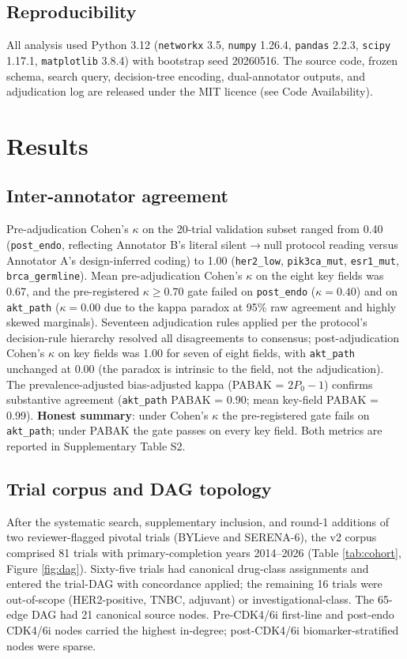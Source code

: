 \documentclass[11pt,a4paper]{article}
\begin{document}
\subsection{Reproducibility}
All analysis used Python 3.12 (\texttt{networkx} 3.5, \texttt{numpy} 1.26.4, \texttt{pandas} 2.2.3, \texttt{scipy} 1.17.1, \texttt{matplotlib} 3.8.4) with bootstrap seed 20260516. The source code, frozen schema, search query, decision-tree encoding, dual-annotator outputs, and adjudication log are released under the MIT licence (see Code Availability).

\section{Results}\label{sec:results}

\subsection{Inter-annotator agreement}
Pre-adjudication Cohen's $\kappa$ on the 20-trial validation subset ranged from 0.40 (\texttt{post\_endo}, reflecting Annotator B's literal silent$\to$null protocol reading versus Annotator A's design-inferred coding) to 1.00 (\texttt{her2\_low}, \texttt{pik3ca\_mut}, \texttt{esr1\_mut}, \texttt{brca\_germline}). Mean pre-adjudication Cohen's $\kappa$ on the eight key fields was 0.67, and the pre-registered $\kappa \ge 0.70$ gate failed on \texttt{post\_endo} ($\kappa = 0.40$) and on \texttt{akt\_path} ($\kappa = 0.00$ due to the kappa paradox at 95\% raw agreement and highly skewed marginals). Seventeen adjudication rules applied per the protocol's decision-rule hierarchy resolved all disagreements to consensus; post-adjudication Cohen's $\kappa$ on key fields was 1.00 for seven of eight fields, with \texttt{akt\_path} unchanged at 0.00 (the paradox is intrinsic to the field, not the adjudication). The prevalence-adjusted bias-adjusted kappa (PABAK = $2P_0 - 1$) confirms substantive agreement (\texttt{akt\_path} PABAK = 0.90; mean key-field PABAK = 0.99). \textbf{Honest summary}: under Cohen's $\kappa$ the pre-registered gate fails on \texttt{akt\_path}; under PABAK the gate passes on every key field. Both metrics are reported in Supplementary Table S2.

\subsection{Trial corpus and DAG topology}
After the systematic search, supplementary inclusion, and round-1 additions of two reviewer-flagged pivotal trials (BYLieve and SERENA-6), the v2 corpus comprised 81 trials with primary-completion years 2014--2026 (Table \ref{tab:cohort}, Figure \ref{fig:dag}). Sixty-five trials had canonical drug-class assignments and entered the trial-DAG with concordance applied; the remaining 16 trials were out-of-scope (HER2-positive, TNBC, adjuvant) or investigational-class. The 65-edge DAG had 21 canonical source nodes. Pre-CDK4/6i first-line and post-endo CDK4/6i nodes carried the highest in-degree; post-CDK4/6i biomarker-stratified nodes were sparse.
\end{document}
